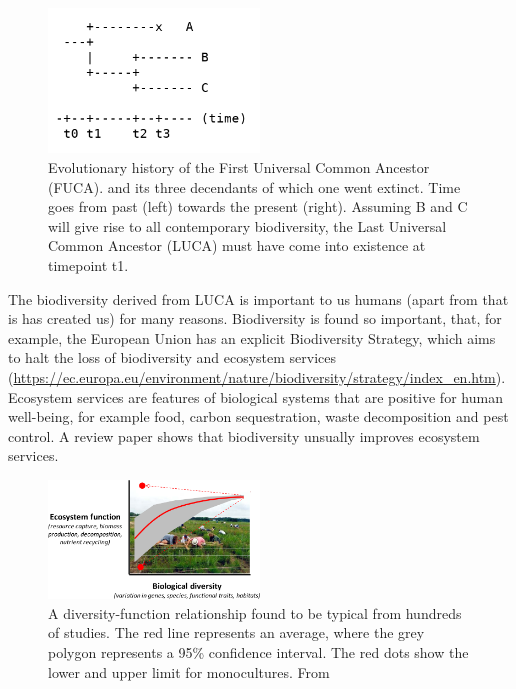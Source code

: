 \begin{figure}[H]
  \includegraphics[width=0.5\textwidth]{t_3.png}
  \caption{
    Evolutionary history of the First Universal Common Ancestor (FUCA).
    and its three decendants of which one went extinct.
    Time goes from past (left) towards the present (right).
    Assuming B and C will give rise to all contemporary biodiversity,
    the Last Universal Common Ancestor (LUCA) must have come into existence
    at timepoint t1.
  }
  \label{fig:t_3}
\end{figure}

The biodiversity derived from LUCA is important to us 
humans (apart from that is has created us) for many reasons.
Biodiversity is found so important, that, for example, 
the European Union has an explicit Biodiversity Strategy,
which aims to halt the loss of biodiversity and ecosystem 
services (\url{https://ec.europa.eu/environment/nature/biodiversity/strategy/index_en.htm}).
Ecosystem services are features of biological systems that are 
positive for human well-being, for example food,
carbon sequestration, waste decomposition and pest control.
A review paper \cite{cardinale2012biodiversity} shows that 
biodiversity unsually improves ecosystem services.

\begin{figure}[H]
  \includegraphics[width=0.5\textwidth]{cardinale_et_al_fig_1.png}
  \caption{
    A diversity-function relationship found to be typical from hundreds
    of studies. The red line represents an average, where the grey polygon
    represents a 95\% confidence interval. The red dots show the lower
    and upper limit for monocultures. From \cite{cardinale2012biodiversity}
  }
  \label{fig:cardinale_et_al}
\end{figure}


